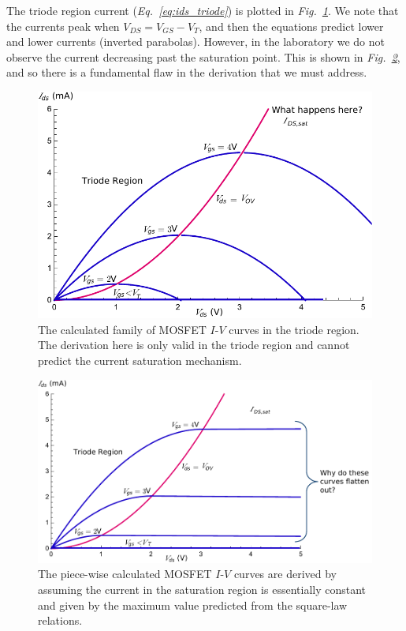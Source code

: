 The triode region current (\emph{Eq.~\ref{eq:ids_triode}}) is plotted in \emph{Fig.~\ref{fig:ids_triode_only}}.  We note that the currents peak when $V_{DS} = V_{GS} - V_T$, and then the equations predict lower and lower currents (inverted parabolas).  However, in the laboratory we do not observe the current decreasing past the saturation point.  This is shown in \emph{Fig.~\ref{fig:ids_family}}, and so there is a fundamental flaw in the derivation that we must address.
\newpage
\begin{figure}[t]
\centering
\includegraphics[width=\columnwidth]{ids_triode_only} 
\caption{The calculated family of MOSFET $I$-$V$ curves in the triode region.  The derivation here is only valid in the triode region and cannot predict the current saturation mechanism.}
\label{fig:ids_triode_only}
\end{figure}
\vspace{1cm}
\begin{figure}[H]
\centering
\includegraphics[width=\columnwidth]{ids_idsat_full} 
\caption{The piece-wise calculated MOSFET $I$-$V$ curves are derived by assuming the current in the saturation region is essentially constant and given by the maximum value predicted from the square-law relations.}
\label{fig:ids_family}
\end{figure}
